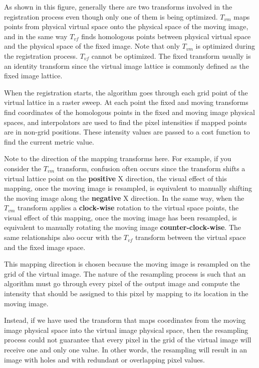 As shown in this figure, generally there are two transforms involved in the
registration process even though only one of them is being optimized. $T_{vm}$
maps points from physical virtual space onto the physical space of the moving
image, and in the same way $T_{vf}$ finds homologous points between physical
virtual space and the physical space of the fixed image. Note that only
$T_{vm}$ is optimized during the registration process. $T_{vf}$ cannot be
optimized. The fixed transform usually is an identity transform since the
virtual image lattice is commonly defined as the fixed image lattice.

When the registration starts, the algorithm goes through each grid point of the
virtual lattice in a raster sweep. At each point the fixed
and moving transforms find coordinates of the homologous points in the fixed
and moving image physical spaces, and interpolators are used to find the pixel
intensities if mapped points are in non-grid positions. These intensity values
are passed to a cost function to find the current metric value.

Note to the direction of the mapping transforms here. For example,
if you consider the $T_{vm}$ transform, confusion often occurs since
the transform shifts a virtual lattice point on the \textbf{positive}
X direction, the visual effect of this mapping, once the moving
image is resampled, is equivalent to manually shifting the moving
image along the \textbf{negative} X direction. In the same way, when
the $T_{vm}$ transform applies a \textbf{clock-wise} rotation to the
virtual space points, the visual effect of this mapping, once the
moving image has been resampled, is equivalent to manually rotating
the moving image \textbf{counter-clock-wise}. The same relationships
also occur with the $T_{vf}$ transform between the virtual space and
the fixed image space.

This mapping direction is chosen because the moving image is resampled
on the grid of the virtual image. The nature of the resampling process
is such that an algorithm must go through every pixel of the output image
and compute the intensity that should be assigned to this pixel by
mapping to its location in the moving image.

Instead, if we have used the transform that maps coordinates from the
moving image physical space into the virtual image physical space,
then the resampling process could not guarantee that every pixel in
the grid of the virtual image will receive one and only one value.
In other words, the resampling will result in an image with
holes and with redundant or overlapping pixel values.

